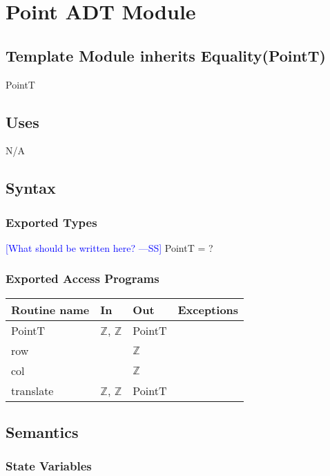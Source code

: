 \documentclass[12pt]{article}
\newcommand{\authornote}[3]{\textcolor{#1}{[#3 ---#2]}}
\newcommand{\authornote}[3]{}
\newcommand{\wss}[1]{\authornote{blue}{SS}{#1}}
\begin{document}
\section* {Point ADT Module}

\subsection*{Template Module inherits Equality(PointT)}

PointT

\subsection* {Uses}

N/A

\subsection* {Syntax}

\subsubsection* {Exported Types}

\wss{What should be written here?} PointT = ?

\subsubsection* {Exported Access Programs}

\begin{tabular}{| l | l | l | l |}
\hline
\textbf{Routine name} & \textbf{In} & \textbf{Out} & \textbf{Exceptions}\\
\hline
PointT & $\mathbb{Z}$, $\mathbb{Z}$ & PointT & \\
\hline
row & ~ & $\mathbb{Z}$ & ~\\
\hline
col & ~ & $\mathbb{Z}$ & ~\\
\hline
translate & $\mathbb{Z}$, $\mathbb{Z}$ & PointT & ~\\
\hline
\end{tabular}

\subsection* {Semantics}

\subsubsection* {State Variables}
\end{document}
